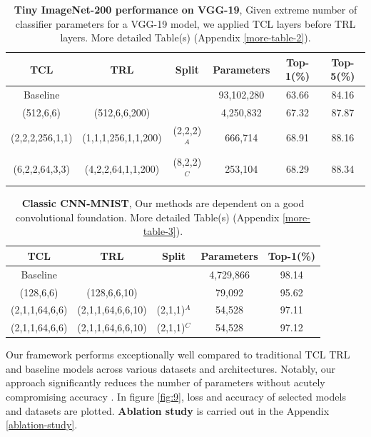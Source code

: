 \documentclass{article}
\begin{document}
	\begin{table}
		\centering
		\caption{
			\textbf{Tiny ImageNet-200 performance on VGG-19},
			 Given extreme number of classifier parameters for a VGG-19 model, we applied TCL layers before TRL layers. More detailed Table(s) (Appendix \ref{more-table-2}). 
			}
		\label{table:vgg_tiny}
		\begin{tabular}{c c c c c c}
			\toprule
			\textbf{TCL} & \textbf{TRL} & \textbf{Split} & \textbf{Parameters} & \textbf{Top-1(\%)} & \textbf{Top-5(\%)} \\
			\midrule
			 Baseline &   &   & 93,102,280 & 63.66 & 84.16 \\ 
			(512,6,6) & (512,6,6,200) &   & 4,250,832 & 67.32 & 87.87 \\ 
			(2,2,2,256,1,1) & (1,1,1,256,1,1,200) & (2,2,2)\(^A\) & 666,714 & 68.91 & 88.16 \\ 
			(6,2,2,64,3,3) & (4,2,2,64,1,1,200) & (8,2,2)\(^C\) & 253,104 & 68.29 & 88.34 \\ 
			\bottomrule
		\end{tabular}
	\end{table}
	
	\begin{table}
		\centering
		\caption{
			\textbf{Classic CNN-MNIST},  Our methods are dependent on a good convolutional foundation. More detailed Table(s) (Appendix \ref{more-table-3}). 
			}
		\label{table:cnn_mnist}
		\begin{tabular}{c c c c c}
			\toprule
			\textbf{TCL} & \textbf{TRL} & \textbf{Split} & \textbf{Parameters} & \textbf{Top-1(\%)} \\
			\midrule
			Baseline &   &   & 4,729,866 & 98.14 \\ 
			(128,6,6) & (128,6,6,10) &   & 79,092 & 95.62 \\ 
			(2,1,1,64,6,6) & (2,1,1,64,6,6,10) & (2,1,1)\(^A\) & 54,528 & 97.11 \\ 
			(2,1,1,64,6,6) & (2,1,1,64,6,6,10) & (2,1,1)\(^C\) & 54,528 & 97.12 \\ 
			\bottomrule
		\end{tabular}
	\end{table}
	
%	
	Our framework performs exceptionally well compared to traditional TCL TRL and baseline models across various datasets and architectures. Notably, our approach significantly reduces the number of parameters without acutely compromising accuracy . In figure \ref{fig:9}, loss and accuracy of selected models and datasets are plotted. \textbf{Ablation study} is carried out in the Appendix \ref{ablation-study}.
	
\end{document}
